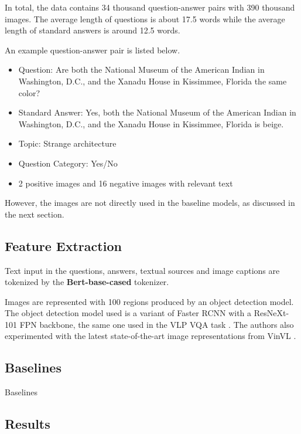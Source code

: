 \documentclass[nohyperref]{article}
\theoremstyle{plain}
\theoremstyle{definition}
\theoremstyle{remark}
\begin{document}
    In total, the data contains 34 thousand question-answer pairs with 390 thousand images.
    The average length of questions is about 17.5 words while the average length of standard answers is around 12.5 words.

    An example question-answer pair is listed below.
    \begin{itemize}
        \item Question: Are both the National Museum of the American Indian in Washington, D.C., and the Xanadu House
        in Kissimmee, Florida the same color?
        \item Standard Answer: Yes, both the National Museum of the American Indian in Washington, D.C., and the Xanadu
        House in Kissimmee, Florida is beige.
        \item Topic: Strange architecture
        \item Question Category: Yes/No
        \item 2 positive images and 16 negative images with relevant text
    \end{itemize}

    However, the images are not directly used in the baseline models, as discussed in the next section.

    \subsection{Feature Extraction}

    Text input in the questions, answers, textual sources and image captions are tokenized by the \textbf{Bert-base-cased} \cite{bert} tokenizer.

    Images are represented with 100 regions produced by an object detection model.
    The object detection model used is a variant of Faster RCNN with a ResNeXt-101 FPN backbone, the same one used in
    the VLP VQA task \cite{vlp}.
    The authors also experimented with the latest state-of-the-art image representations from VinVL \cite{VinVL}.

    \subsection{Baselines}

    Baselines

    \subsection{Results}
\end{document}
